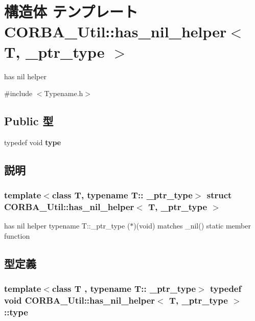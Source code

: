 \section{構造体 テンプレート CORBA\_\-Util::has\_\-nil\_\-helper$<$ T, \_\-ptr\_\-type $>$}
\label{structCORBA__Util_1_1has__nil__helper}


has nil helper  




{\ttfamily \#include $<$Typename.h$>$}

\subsection*{Public 型}
\begin{DoxyCompactItemize}
\item 
typedef void {\bf type}
\end{DoxyCompactItemize}


\subsection{説明}
\subsubsection*{template$<$class T, typename T:: \_\-ptr\_\-type$>$ struct CORBA\_\-Util::has\_\-nil\_\-helper$<$ T, \_\-ptr\_\-type $>$}

has nil helper typename T::\_\-ptr\_\-type ($\ast$)(void) matches \_\-nil() static member function 

\subsection{型定義}
\subsubsection[{type}]{\setlength{\rightskip}{0pt plus 5cm}template$<$class T , typename T:: \_\-ptr\_\-type$>$ typedef void {\bf CORBA\_\-Util::has\_\-nil\_\-helper}$<$ T, \_\-ptr\_\-type $>$::{\bf type}}\label{structCORBA__Util_1_1has__nil__helper_af4f472147f8ea6648709cc87c80c08f0}
